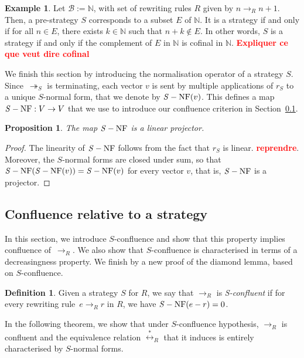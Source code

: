 \documentclass[10pt]{easychair}
\newtheorem{proposition}[theorem]{Proposition}
\theoremstyle{definition}
\newtheorem{definition}[theorem]{Definition}
\newtheorem{example}[theorem]{Example}
\newcommand\todo[1]{{\bf\textcolor{red}{#1}}}
\newcommand\basis{\mathscr{B}}
\newcommand\rewR{\to_R}
\newcommand\rewS{\twoheadrightarrow_S}
\newcommand\equivR{\overset{*}{\leftrightarrow}_R}
\DeclareMathOperator{\SNF}{{\it S}-NF}
\begin{document}
\begin{example}\label{ex:case_N}
  Let $\basis:= \mathbb N$, with set of rewriting rules $R$ given by
  $n \rewR n+1$. Then, a pre-strategy $S$ corresponds to a subset $E$ of
  $\mathbb N$. It is a strategy if and only if for all $n \in E$, there
  exists $k \in \mathbb N$ such that $n + k \notin E$. In other words,
  $S$ is a strategy if and only if the complement of $E$ in $\mathbb N$ 
  is cofinal in $\mathbb N$. \todo{Expliquer ce que veut dire cofinal}
\end{example}
\smallskip

We finish this section by introducing the normalisation operator of a
strategy $S$. Since~$\rewS$ is terminating, each vector $v$ is sent by
multiple applications of $r_S$ to a unique $S$-normal form, that we
denote by $\SNF(v)$. This defines a map $\SNF:V\to V$ that we use to
introduce our confluence criterion in
Section~\ref{sec:confluence_relative_to_a_strategy}.
\medskip

\begin{proposition}\label{prop:linearity_of_H}
  The map $\SNF$ is a linear projector.
\end{proposition}

\begin{proof}
  The linearity of $\SNF$ follows from the fact that $r_S$ is linear.
  \todo{reprendre}. Moreover, the $S$-normal forms are closed under sum,
  so that $\SNF(\SNF(v))=\SNF(v)$ for every vector $v$, that is, $\SNF$
  is a projector. 
\end{proof}

\subsection{Confluence relative to a strategy}
\label{sec:confluence_relative_to_a_strategy}

In this section, we introduce $S$-confluence and show that this property
implies confluence of~$\rewR$. We also show that $S$-confluence is
characterised in terms of a decreasingness property. We finish by a new
proof of the diamond lemma, based on $S$-confluence.
\smallskip

\begin{definition}\label{def:standardisation_property}
  Given a strategy $S$ for $R$, we say that $\rewR$ is \emph{S-confluent}
  if for every rewriting rule~$e\rewR r$ in $R$, we have $\SNF(e-r)=0$.
\end{definition}
\smallskip

In the following theorem, we show that under $S$-confluence hypothesis,
$\rewR$ is confluent and the equivalence relation $\equivR$ that it
induces is entirely characterised by $S$-normal forms. 
\medskip
\end{document}
